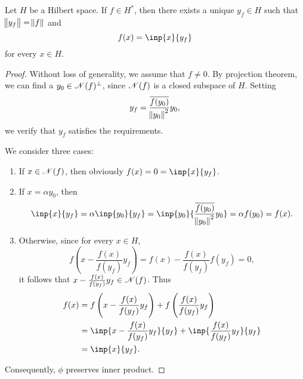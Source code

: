 \begin{thm}
Let $H$ be a Hilbert space. 
If $f \in H^\ast$, then there exists a unique $y_f \in H$ such that 
$\norm{y_f} = \norm{f}$ and 
\begin{equation*}
    f(x) = \inp{x}{y_f}
\end{equation*}
for every $x \in H$. 
\end{thm}
\begin{proof}
Without loss of generality, we assume that $f \neq 0$. 
By projection theorem, we can find a $y_0 \in \mathscr{N}(f)^\perp$, since $\mathscr{N}(f)$ 
is a closed subspace of $H$. 
Setting 
\begin{equation*}
    y_f = \frac{\overline{f(y_0)}}{\norm{y_0}^2} y_0, 
\end{equation*}
we verify that $y_f$ satisfies the requirements. 

We consider three cases: 
\begin{enumerate}
    \item If $x \in \mathscr{N}(f)$, then obviously $f(x) = 0 = \inp{x}{y_f}$. 
    \item If $x = \alpha y_0$, then 
    \begin{equation*}
        \inp{x}{y_f} = \alpha \inp{y_0}{y_f} 
        = \inp{y_0}{\frac{\conj{f(y_0)}} {\norm{y_0}^2} y_0 }
        = \alpha f(y_0) = f(x). 
    \end{equation*}
    \item Otherwise, since for every $x \in H$, 
    \begin{equation*}
        f(x - \frac{f(x)}{f(y_f)} y_f) 
        = f(x) - \frac{f(x)}{f(y_f)} f(y_f) 
        = 0, 
    \end{equation*}
    it follows that $x - \frac{f(x)}{f(y_f)} y_f \in \mathscr{N}(f)$. 
    Thus 
    \begin{equation*}
        \begin{aligned}
            f(x) &= f\left( x - \frac{f(x)}{f(y_f)} y_f \right) 
                + f\left( \frac{f(x)}{f(y_f)} y_f \right) \\
            &= \inp{x - \frac{f(x)}{f(y_f)} y_f}{y_f} 
                + \inp{\frac{f(x)}{f(y_f)} y_f}{y_f} \\
            &= \inp{x}{y_f}.
        \end{aligned}
    \end{equation*}
\end{enumerate}
Consequently, $\phi$ preserves inner product. 


\end{proof}
